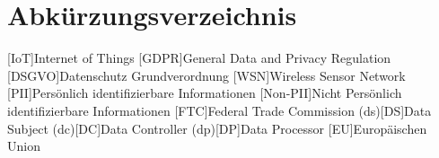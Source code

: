 
\section*{Abkürzungsverzeichnis}

\begin{acronym}[IoT]

[IoT]{Internet of Things}
[GDPR]{General Data and Privacy Regulation}
[DSGVO]{Datenschutz Grundverordnung}
[WSN]{Wireless Sensor Network}
[PII]{Persönlich identifizierbare Informationen}
[Non-PII]{Nicht Persönlich identifizierbare Informationen}
[FTC]{Federal Trade Commission}
\acro(ds)[DS]{Data Subject}
\acro(dc)[DC]{Data Controller}
\acro(dp)[DP]{Data Processor}
[EU]{Europäischen Union}


\end{acronym}